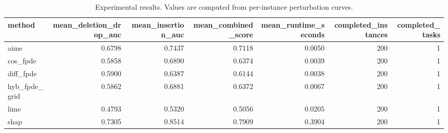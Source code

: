 \begin{table}[t]
\caption{Experimental results. Values are computed from per-instance perturbation curves.}
\label{tab:main_results_computed}
\centering
\begin{tabular}{lrrrrrr}
\toprule
method & mean\_deletion\_drop\_auc & mean\_insertion\_auc & mean\_combined\_score & mean\_runtime\_seconds & completed\_instances & completed\_tasks \\
\midrule
aime & 0.6798 & 0.7437 & 0.7118 & 0.0050 & 200 & 1 \\
cos\_fpde & 0.5858 & 0.6890 & 0.6374 & 0.0039 & 200 & 1 \\
diff\_fpde & 0.5900 & 0.6387 & 0.6144 & 0.0038 & 200 & 1 \\
hyb\_fpde\_grid & 0.5862 & 0.6881 & 0.6372 & 0.0067 & 200 & 1 \\
lime & 0.4793 & 0.5320 & 0.5056 & 0.0205 & 200 & 1 \\
shap & 0.7305 & 0.8514 & 0.7909 & 0.3904 & 200 & 1 \\
\bottomrule
\end{tabular}

\end{table}
